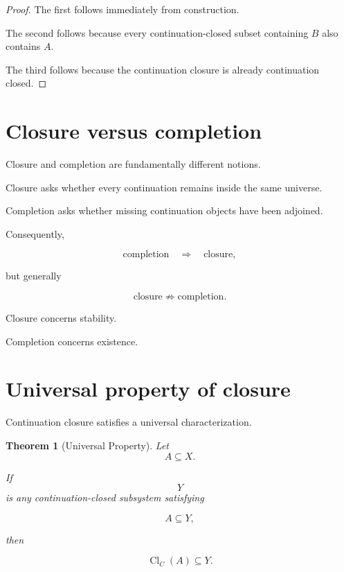 \documentclass[13pt,openany]{book}
\theoremstyle{plain}
\newtheorem{theorem}{Theorem}[chapter]
\theoremstyle{definition}
\begin{document}
\begin{proof}

The first follows immediately from construction.

The second follows because every continuation-closed subset containing
\(B\) also contains \(A\).

The third follows because the continuation closure is already continuation
closed.

\end{proof}


\section{Closure versus completion}

Closure and completion are fundamentally different notions.

Closure asks whether every continuation remains inside the same universe.

Completion asks whether missing continuation objects have been adjoined.

Consequently,

\[
\text{completion}
\quad\Longrightarrow\quad
\text{closure},
\]

but generally

\[
\text{closure}
\not\Longrightarrow
\text{completion}.
\]

Closure concerns stability.

Completion concerns existence.


\section{Universal property of closure}

Continuation closure satisfies a universal characterization.

\begin{theorem}[Universal Property]

Let
\[
A\subseteq X.
\]

If
\[
Y
\]
is any continuation-closed subsystem satisfying

\[
A\subseteq Y,
\]

then

\[
\operatorname{Cl}_C(A)
\subseteq
Y.
\]

\end{theorem}
\end{document}

